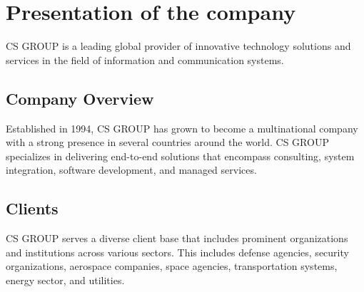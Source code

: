 \section{Presentation of the company}
CS GROUP is a leading global provider of innovative technology
solutions and services in the field of information and communication
systems.

\subsection{Company Overview}
Established in 1994, CS GROUP has grown to become a multinational
company with a strong presence in several countries around the world.
CS GROUP specializes in delivering end-to-end solutions that encompass
consulting, system integration, software development, and managed
services.

\subsection{Clients}
CS GROUP serves a diverse client base that includes prominent
organizations and institutions across various sectors. This includes
defense agencies, security organizations, aerospace companies, space
agencies, transportation systems, energy sector, and utilities.